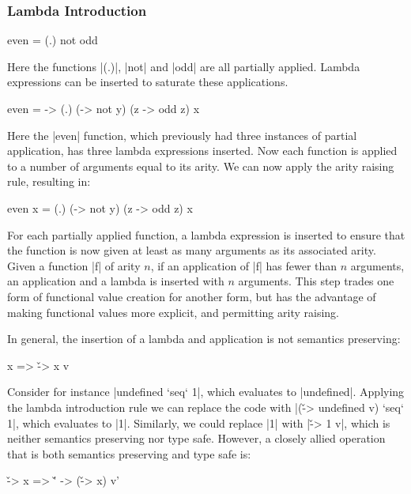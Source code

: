 \documentclass[preprint]{sigplanconf}
\begin{document}
\subsubsection{Lambda Introduction}

\begin{example}
\begin{code}
even = (.) not odd
\end{code}

Here the functions |(.)|, |not| and |odd| are all partially applied. Lambda expressions can be inserted to saturate these applications.

\begin{code}
even = \x -> (.) (\y -> not y) (z -> odd z) x
\end{code}

Here the |even| function, which previously had three instances of partial application, has three lambda expressions inserted. Now each function is applied to a number of arguments equal to its arity. We can now apply the arity raising rule, resulting in:

\begin{code}
even x = (.) (\y -> not y) (z -> odd z) x
\end{code}
\end{example}

For each partially applied function, a lambda expression is inserted to ensure that the function is now given at least as many arguments as its associated arity. Given a function |f| of arity $n$, if an application of |f| has fewer than $n$ arguments, an application and a lambda is inserted with $n$ arguments. This step trades one form of functional value creation for another form, but has the advantage of making functional values more explicit, and permitting arity raising.

In general, the insertion of a lambda and application is not semantics preserving:

\begin{code}
x => \v -> x v
\end{code}

Consider for instance |undefined `seq` 1|, which evaluates to |undefined|. Applying the lambda introduction rule we can replace the code with |(\v -> undefined v) `seq` 1|, which evaluates to |1|. Similarly, we could replace |1| with |\v -> 1 v|, which is neither semantics preserving nor type safe. However, a closely allied operation that is both semantics preserving and type safe is:

\begin{code}
\v -> x => \v' -> (\v -> x) v'
\end{code}
\end{document}
